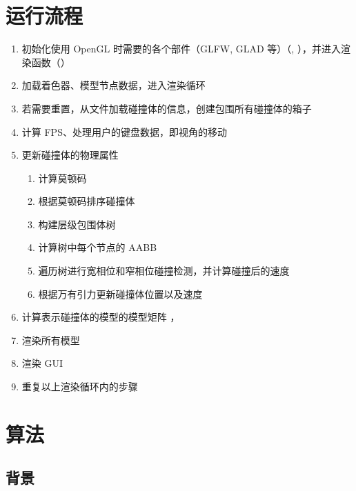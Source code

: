 \newpage

\section{运行流程}

\begin{enumerate}
    \item 初始化使用 OpenGL 时需要的各个部件（GLFW, GLAD 等）（, ），并进入渲染函数（）
    \item 加载着色器、模型节点数据，进入渲染循环
    \item 若需要重置，从文件加载碰撞体的信息，创建包围所有碰撞体的箱子
    \item 计算 FPS、处理用户的键盘数据，即视角的移动
    \item 更新碰撞体的物理属性 
    \begin{enumerate}
        \item 计算莫顿码 
        \item 根据莫顿码排序碰撞体
        \item 构建层级包围体树 
        \item 计算树中每个节点的 AABB 
        \item 遍历树进行宽相位和窄相位碰撞检测，并计算碰撞后的速度 
        \item 根据万有引力更新碰撞体位置以及速度 
    \end{enumerate}
    \item 计算表示碰撞体的模型的模型矩阵 ，\\
    \item 渲染所有模型
    \item 渲染 GUI
    \item 重复以上渲染循环内的步骤
\end{enumerate}

\newpage

\section{算法}

\subsection{背景}

